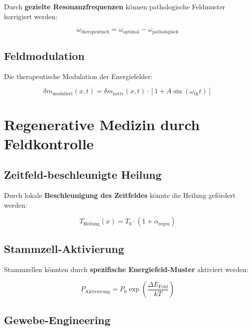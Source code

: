 \documentclass[12pt,a4paper]{report}
\begin{document}
	Durch \textbf{gezielte Resonanzfrequenzen} können pathologische Feldmuster korrigiert werden:
	
	\begin{equation}
		\omega_{\text{therapeutisch}} = \omega_{\text{optimal}} - \omega_{\text{pathologisch}}
	\end{equation}
	
	\subsection{Feldmodulation}
	
	Die therapeutische Modulation der Energiefelder:
	
	\begin{equation}
		\delta m_{\text{moduliert}}(x,t) = \delta m_{\text{nativ}}(x,t) \cdot [1 + A\sin(\omega_{\text{th}}t)]
	\end{equation}
	
	\section{Regenerative Medizin durch Feldkontrolle}
	
	\subsection{Zeitfeld-beschleunigte Heilung}
	
	Durch lokale \textbf{Beschleunigung des Zeitfeldes} könnte die Heilung gefördert werden:
	
	\begin{equation}
		T_{\text{Heilung}}(x) = T_0 \cdot (1 + \alpha_{\text{regen}})
	\end{equation}
	
	\subsection{Stammzell-Aktivierung}
	
	Stammzellen könnten durch \textbf{spezifische Energiefeld-Muster} aktiviert werden:
	
	\begin{equation}
		P_{\text{Aktivierung}} = P_0 \exp\left(\frac{\Delta E_{\text{Feld}}}{kT}\right)
	\end{equation}
	
	\subsection{Gewebe-Engineering}
	
\end{document}
